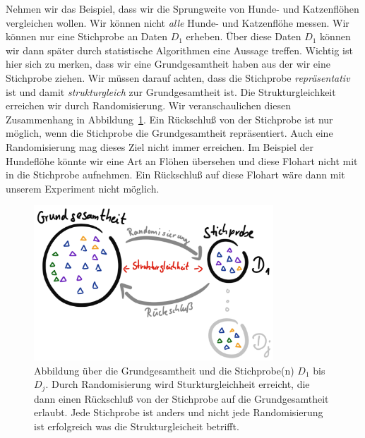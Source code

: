 \documentclass[
  letterpaper,
]{scrbook}
\begin{document}
{}

Nehmen wir das Beispiel, dass wir die Sprungweite von Hunde- und
Katzenflöhen vergleichen wollen. Wir können nicht \emph{alle} Hunde- und
Katzenflöhe messen. Wir können nur eine Stichprobe an Daten \(D_1\)
erheben. Über diese Daten \(D_1\) können wir dann später durch
statistische Algorithmen eine Aussage treffen. Wichtig ist hier sich zu
merken, dass wir eine Grundgesamtheit haben aus der wir eine Stichprobe
ziehen. Wir müssen darauf achten, dass die Stichprobe
\emph{repräsentativ} ist und damit \emph{strukturgleich} zur
Grundgesamtheit ist. Die Strukturgleichkeit erreichen wir durch
Randomisierung. Wir veranschaulichen diesen Zusammenhang in
Abbildung~\ref{fig-grundgesamtheit-schema}. Ein Rückschluß von der
Stichprobe ist nur möglich, wenn die Stichprobe die Grundgesamtheit
repräsentiert. Auch eine Randomisierung mag dieses Ziel nicht immer
erreichen. Im Beispiel der Hundeflöhe könnte wir eine Art an Flöhen
übersehen und diese Flohart nicht mit in die Stichprobe aufnehmen. Ein
Rückschluß auf diese Flohart wäre dann mit unserem Experiment nicht
möglich.

\begin{figure}

{\centering \includegraphics[width=0.8\textwidth,height=\textheight]{./images/preface-grundgesamtheit.png}

}

\caption{\label{fig-grundgesamtheit-schema}Abbildung über die
Grundgesamtheit und die Stichprobe(n) \(D_1\) bis \(D_j\). Durch
Randomisierung wird Sturkturgleichheit erreicht, die dann einen
Rückschluß von der Stichprobe auf die Grundgesamtheit erlaubt. Jede
Stichprobe ist anders und nicht jede Randomisierung ist erfolgreich was
die Strukturgleicheit betrifft.}

\end{figure}
\end{document}
